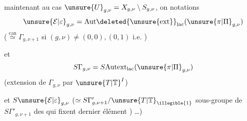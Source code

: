  maintenant au cas 
$\unsure{U}_{g,\nu}=X_{g,\nu}\setminus S_{g,\nu}$, on   notations
\[
\unsure{\mathcal E|\varepsilon}_{g,\nu}
=\mathrm{Aut}\deleted{\unsure{\mathrm{ext}}}_{\mathrm{lac}}
(\unsure{\pi|\Pi}_{g,\nu})
\]
($\stackrel{\mathrm{can}}{\simeq}\Gamma_{g,\nu+1}$ si $(g,\nu)\ne(0,0),(0,1)$ i.e. ) 

et
\[
S\Gamma_{g,\nu}=S\mathrm{Autext}_{\mathrm{lac}}(\unsure{\pi|\Pi}_{g,\nu})
\]
(extension de $\Gamma_{g,\nu}$ par $\unsure{T|\mathbb T}^I$)

et $S\unsure{\mathcal E|\varepsilon}_{g,\nu}$
($\simeq S\Gamma'_{g,\nu+1}/\unsure{T|\mathbb T}_{\illegible{1}}$
sous-groupe de $S\Gamma'_{g,\nu+1}$ des  qui fixent  dernier élément ) \ldots)
